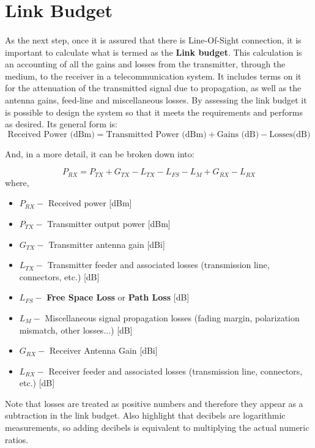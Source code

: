 \section{Link Budget}\label{subsec:link_budget}
\paragraph{}
As the next step, once it is assured that there is Line-Of-Sight connection, it is important to calculate what is termed as the \textbf{Link budget}. This calculation is an accounting of all the gains and losses from the transmitter, through the medium,  to the receiver in a telecommunication system. It includes terms on it for the attenuation of the transmitted signal due to propagation, as well as the antenna gains, feed-line and miscellaneous losses. By assessing the link budget it is possible to design the system so that it meets the requirements and performs as desired. Its general form is:
\begin{equation*}\label{eq:link_budget} 
 		\text{Received Power (dBm)} = \text{Transmitted Power (dBm)} + \text{Gains (dB)} - \text{Losses(dB)}
\end{equation*}

And, in a more detail, it can be broken down into:

\begin{equation*}\label{eq:link_budget} 
 		P_{RX} = P_{TX} + G_{TX} - L_{TX} - L_{FS} - L_{M} + G_{RX} - L_{RX}
\end{equation*}
where,
\begin{itemize}
	\item{$P_{RX} -$ Received power [dBm]}
	\item{$P_{TX} -$ Transmitter output power [dBm]}
	\item{$G_{TX} -$ Transmitter antenna gain [dBi]}
	\item{$L_{TX} -$ Transmitter feeder and associated losses (transmission line, connectors, etc.) [dB]}
	\item{$L_{FS} -$ \textbf{Free Space Loss} or \textbf{Path Loss} [dB]}
	\item{$L_{M} -$ Miscellaneous signal propagation losses (fading margin, polarization mismatch, other losses...) [dB]} 
	\item{$G_{RX} -$ Receiver Antenna Gain [dBi]}
	\item{$L_{RX} -$ Receiver feeder and associated losses (transmission line, connectors, etc.) [dB]} 
\end{itemize}
Note that losses are treated as positive numbers and therefore they appear as a subtraction in the link budget. Also highlight that decibels are logarithmic measurements, so adding decibels is equivalent to multiplying the actual numeric ratios.
 
